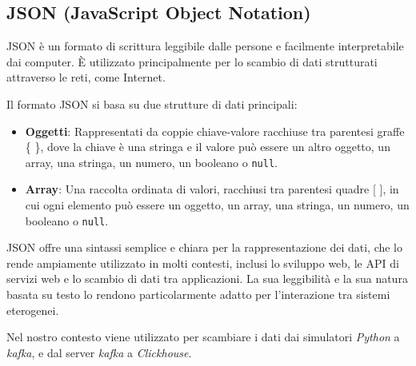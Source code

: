 \subsection{JSON (JavaScript Object Notation)}
JSON è un formato di scrittura leggibile dalle persone e facilmente interpretabile dai computer. È utilizzato principalmente per lo scambio di dati strutturati attraverso le reti, come Internet.

Il formato JSON si basa su due strutture di dati principali:

\begin{itemize}
  \item \textbf{Oggetti}: Rappresentati da coppie chiave-valore racchiuse tra parentesi graffe \{ \}, dove la chiave è una stringa e il valore può essere un altro oggetto, un array, una stringa, un numero, un booleano o \texttt{null}.
  \item \textbf{Array}: Una raccolta ordinata di valori, racchiusi tra parentesi quadre [ ], in cui ogni elemento può essere un oggetto, un array, una stringa, un numero, un booleano o \texttt{null}.
\end{itemize}

JSON offre una sintassi semplice e chiara per la rappresentazione dei dati, che lo rende ampiamente utilizzato in molti contesti, inclusi lo sviluppo web, le API di servizi web e lo scambio di dati tra applicazioni. La sua leggibilità e la sua natura basata su testo lo rendono particolarmente adatto per l'interazione tra sistemi eterogenei.

Nel nostro contesto viene utilizzato per scambiare i dati dai simulatori \textit{Python} a \textit{kafka}, e dal server \textit{kafka} a \textit{Clickhouse}.